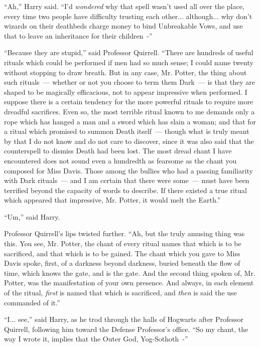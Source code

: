 ``Ah,'' Harry said. ``I'd \emph{wondered} why that spell wasn't used all over the place, every time two people have difficulty trusting each other... although... why don't wizards on their deathbeds charge money to bind Unbreakable Vows, and use that to leave an inheritance for their children~-''

``Because they are stupid,'' said Professor Quirrell. ``There are hundreds of useful rituals which could be performed if men had so much sense; I could name twenty without stopping to draw breath. But in any case, Mr. Potter, the thing about such rituals~--- whether or not you choose to term them Dark~--- is that they are shaped to be magically efficacious, not to appear impressive when performed. I suppose there is a certain tendency for the more powerful rituals to require more dreadful sacrifices. Even so, the most terrible ritual known to me demands only a rope which has hanged a man and a sword which has slain a woman; and that for a ritual which promised to summon Death itself~--- though what is truly meant by that I do not know and do not care to discover, since it was also said that the counterspell to dismiss Death had been lost. The most dread chant I have encountered does not sound even a hundredth as fearsome as the chant you composed for Miss Davis. Those among the bullies who had a passing familiarity with Dark rituals~--- and I am certain that there were some~--- must have been terrified beyond the capacity of words to describe. If there existed a true ritual which appeared that impressive, Mr. Potter, it would melt the Earth.''

``Um,'' said Harry.

Professor Quirrell's lips twisted further. ``Ah, but the truly amusing thing was this. You see, Mr. Potter, the chant of every ritual names that which is to be sacrificed, and that which is to be gained. The chant which you gave to Miss Davis spoke, first, of a darkness beyond darkness, buried beneath the flow of time, which knows the gate, and is the gate. And the second thing spoken of, Mr. Potter, was the manifestation of your own presence. And always, in each element of the ritual, \emph{first} is named that which is sacrificed, and \emph{then} is said the use commanded of it.''

``I... see,'' said Harry, as he trod through the halls of Hogwarts after Professor Quirrell, following him toward the Defense Professor's office. ``So my chant, the way I wrote it, implies that the Outer God, Yog-Sothoth~-''

